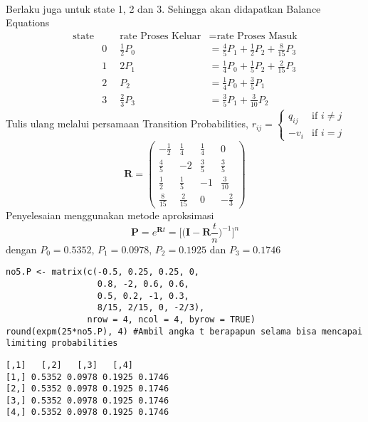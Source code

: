 \documentclass[answers]{exam}
\begin{document}
\begin{questions}
\begin{parts}
\begin{solution}
\begin{align*}
                \end{align*}
                Berlaku juga untuk state 1, 2 dan 3. Sehingga akan didapatkan Balance Equations
                \begin{align*}
                    \text{state}& \quad& \text{rate Proses Keluar} &= \text{rate Proses Masuk} \\ & 0 & \frac{1}{2}P_0 &= \frac{4}{5}P_1 + \frac{1}{2}P_2 + \frac{8}{15}P_3 \\ & 1 & 2P_1 &= \frac{1}{4}P_0 + \frac{1}{5}P_2 + \frac{2}{15}P_3 \\ & 2 & P_2 &= \frac{1}{4}P_0 + \frac{3}{5}P_1 \\ & 3 & \frac{2}{3}P_3 &= \frac{3}{5}P_1 + \frac{3}{10}P_2
                \end{align*}
                Tulis ulang melalui persamaan Transition Probabilities, $r_{ij} = \begin{cases} q_{ij} & \text{if } i\neq j \\ -v_i & \text{if } i = j \end{cases}$
                $$\mathbf{R} = \left(\begin{array}{cccc}-\frac{1}{2} & \frac{1}{4} & \frac{1}{4} & 0 \\ \frac{4}{5} & -2 & \frac{3}{5} & \frac{3}{5} \\ \frac{1}{2} & \frac{1}{5} & -1 & \frac{3}{10} \\ \frac{8}{15} & \frac{2}{15} & 0 & -\frac{2}{3} \end{array}\right)$$
                Penyelesaian menggunakan metode aproksimasi 
                $$\mathbf{P} = e^{\mathbf{R}t} = \biggr[\Bigr(\mathbf{I} - \mathbf{R}\frac{t}{n}\Bigr)^{-1}\biggr]^n$$
                dengan $P_0 = 0.5352$, $P_1 = 0.0978$, $P_2 = 0.1925$ dan $P_3 = 0.1746$
                \end{solution}
                \begin{minipage}[t]{.9\textwidth}
                    \begin{lstlisting}[title=Code]
no5.P <- matrix(c(-0.5, 0.25, 0.25, 0,
                  0.8, -2, 0.6, 0.6,
                  0.5, 0.2, -1, 0.3,
                  8/15, 2/15, 0, -2/3),
                nrow = 4, ncol = 4, byrow = TRUE)
round(expm(25*no5.P), 4) #Ambil angka t berapapun selama bisa mencapai limiting probabilities
                    \end{lstlisting}
                \end{minipage}
                \newline
                \begin{minipage}[t]{.9\textwidth}
                    \begin{lstlisting}[title=Output]
       [,1]   [,2]   [,3]   [,4]
[1,] 0.5352 0.0978 0.1925 0.1746
[2,] 0.5352 0.0978 0.1925 0.1746
[3,] 0.5352 0.0978 0.1925 0.1746
[4,] 0.5352 0.0978 0.1925 0.1746
                    \end{lstlisting}
                \end{minipage}


\end{parts}
\end{questions}
\end{document}
